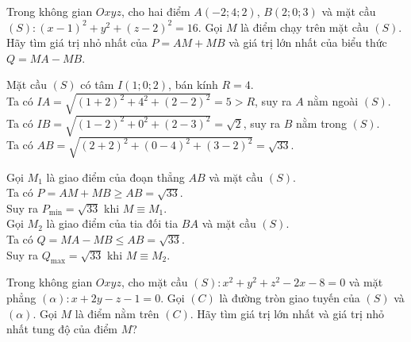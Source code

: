 \begin{bt}%
Trong không gian $Oxyz$, cho hai điểm $A(-2;4;2)$, $B(2;0;3)$ và mặt cầu $(S)\colon (x-1)^2+y^2+(z-2)^2=16$. Gọi $M$ là điểm chạy trên mặt cầu $(S)$. Hãy tìm giá trị nhỏ nhất của $P=AM+MB$ và giá trị lớn nhất của biểu thức $Q=MA-MB$.
\loigiai
{
\immini
{
Mặt cầu $(S)$ có tâm $I(1;0;2)$, bán kính $R=4$. \\
Ta có $IA=\sqrt{\left(1+2\right)^2+4^2+\left(2-2\right)^2}=5>R$, suy ra $A$ nằm ngoài $(S)$. \\
Ta có $IB=\sqrt{\left(1-2\right)^2+0^2+\left(2-3\right)^2}=\sqrt{2}$, suy ra $B$ nằm trong $(S)$. \\
Ta có $AB=\sqrt{\left(2+2\right)^2+\left(0-4\right)^2+\left(3-2\right)^2}=\sqrt{33}$.
}
{
}
\noindent
Gọi $M_1$ là giao điểm của đoạn thẳng $AB$ và mặt cầu $(S)$. \\
Ta có $P=AM+MB\geqslant AB=\sqrt{33}$. \\
Suy ra $P_{\min}=\sqrt{33}$ khi $M\equiv M_1$. \\
Gọi $M_2$ là giao điểm của tia đối tia $BA$ và mặt cầu $(S)$. \\
Ta có $Q=MA-MB\leqslant AB=\sqrt{33}$. \\
Suy ra $Q_{\max}=\sqrt{33}$ khi $M\equiv M_2$.
}
\end{bt}

\begin{bt}%

	Trong không gian $Oxyz$, cho mặt cầu $(S)\colon x^2+y^2+z^2-2 x-8=0$ và mặt phẳng $(\alpha)\colon x+2y-z-1=0$. Gọi $(C)$ là đường tròn giao tuyến của $(S)$ và $(\alpha)$. Gọi $M$ là điểm nằm trên $(C)$. Hãy tìm giá trị lớn nhất và giá trị nhỏ nhất tung độ của điểm $M$?
\end{bt}

